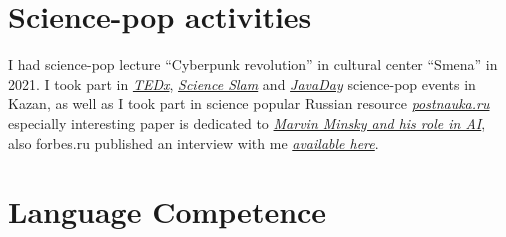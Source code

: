 \documentclass{moderncv}
\begin{document}
    \section{Science-pop activities}
    I had science-pop lecture ``Cyberpunk revolution'' in cultural center ``Smena'' in 2021.
    I took part in \href{https://www.youtube.com/watch?v=BLvS7h3kRbo}{\emph{TEDx}}, \href{https://vk.com/video-87488544_171504962}{\emph{Science Slam}} and \href{https://www.youtube.com/watch?v=sLLKxvUEA7E}{\emph{JavaDay}} science-pop events in Kazan, as well as I took part in science popular Russian resource \href{https://postnauka.ru/author/talanov}{\emph{postnauka.ru}} especially interesting paper is dedicated to \href{https://postnauka.ru/faq/58727}{\emph{Marvin Minsky and his role in AI}}, also forbes.ru published an interview with me \href{http://www.forbes.ru/mneniya-column/288097-kak-sozdat-emotsionalnyi-iskusstvennyi-intellekt}{\emph{available here}}.

    \section{Language Competence}


\end{document}
